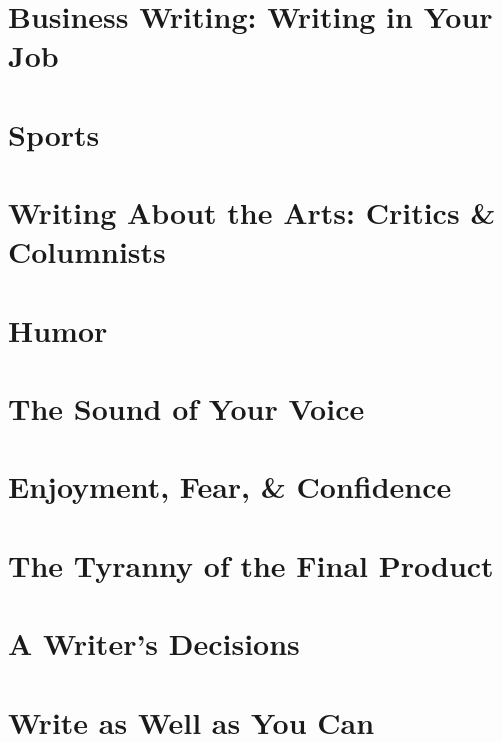 \documentclass{article}
\begin{document}

\section{Business Writing: Writing in Your Job}


\section{Sports}


\section{Writing About the Arts: Critics \& Columnists}


\section{Humor}


\section{The Sound of Your Voice}


\section{Enjoyment, Fear, \& Confidence}


\section{The Tyranny of the Final Product}


\section{A Writer's Decisions}


\section{Write as Well as You Can}


\printbibliography[heading=bibintoc]
\end{document}
